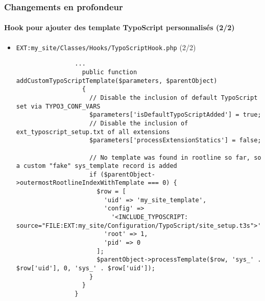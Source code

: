 \begin{frame}[fragile]
	\frametitle{Changements en profondeur}
	\framesubtitle{Hook pour ajouter des template TypoScript personnalisés (2/2)}

	\lstset{basicstyle=\tiny\ttfamily}

	\begin{itemize}
		\item \texttt{EXT:my\_site/Classes/Hooks/TypoScriptHook.php} (2/2)

			\begin{lstlisting}
				...
				  public function addCustomTypoScriptTemplate($parameters, $parentObject)
				  {
				    // Disable the inclusion of default TypoScript set via TYPO3_CONF_VARS
				    $parameters['isDefaultTypoScriptAdded'] = true;
				    // Disable the inclusion of ext_typoscript_setup.txt of all extensions
				    $parameters['processExtensionStatics'] = false;

				    // No template was found in rootline so far, so a custom "fake" sys_template record is added
				    if ($parentObject->outermostRootlineIndexWithTemplate === 0) {
				      $row = [
				        'uid' => 'my_site_template',
				        'config' =>
					      '<INCLUDE_TYPOSCRIPT: source="FILE:EXT:my_site/Configuration/TypoScript/site_setup.t3s">',
				        'root' => 1,
				        'pid' => 0
				      ];
				      $parentObject->processTemplate($row, 'sys_' . $row['uid'], 0, 'sys_' . $row['uid']);
				    }
				  }
				}
			\end{lstlisting}

	\end{itemize}

\end{frame}

